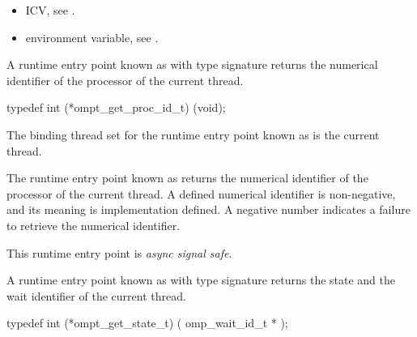 \crossreferences
\begin{itemize}
\item {} ICV, see
.

\item {} environment variable, see
.

\end{itemize}





\label{sec:ompt_get_proc_id_t}
\label{sec:ompt_get_proc_id}

\summary

A runtime entry point known as
 with type signature
 returns the numerical identifier
of the processor of the current thread.

\format

\begin{ccppspecific}
\begin{omptInquiry}
typedef int (*ompt_get_proc_id_t) (void);
\end{omptInquiry}
\end{ccppspecific}


\binding

The binding thread set for
the runtime entry point known as 
is the current thread.

\descr

The runtime entry point known as
 returns the numerical identifier
of the processor of the current thread.
A defined numerical identifier is non-negative, and
its meaning is implementation defined.
A negative number indicates a failure to retrieve the numerical identifier.

This runtime entry point is \emph{async signal safe}.






\label{sec:ompt_get_state_t}
\label{sec:ompt_get_state}

\summary
A runtime entry point known as 
with type signature 
returns the state and the wait identifier of the
current thread.

\format
\begin{ccppspecific}
\begin{omptInquiry}
typedef int (*ompt_get_state_t) (
  omp_wait_id_t *
);
\end{omptInquiry}
\end{ccppspecific}

